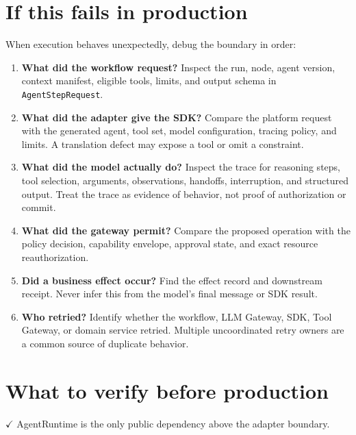 \section{If this fails in production}

When execution behaves unexpectedly, debug the boundary in order:\par

\begin{enumerate}

\item \textbf{What did the workflow request?} Inspect the run, node, agent version, context manifest, eligible tools, limits, and output schema in \lstinline[style=bookinline]!AgentStepRequest!.

\item \textbf{What did the adapter give the SDK?} Compare the platform request with the generated agent, tool set, model configuration, tracing policy, and limits. A translation defect may expose a tool or omit a constraint.

\item \textbf{What did the model actually do?} Inspect the trace for reasoning steps, tool selection, arguments, observations, handoffs, interruption, and structured output. Treat the trace as evidence of behavior, not proof of authorization or commit.

\item \textbf{What did the gateway permit?} Compare the proposed operation with the policy decision, capability envelope, approval state, and exact resource reauthorization.

\item \textbf{Did a business effect occur?} Find the effect record and downstream receipt. Never infer this from the model’s final message or SDK result.

\item \textbf{Who retried?} Identify whether the workflow, LLM Gateway, SDK, Tool Gateway, or domain service retried. Multiple uncoordinated retry owners are a common source of duplicate behavior.

\end{enumerate}

\section{What to verify before production}

\textbf{\ensuremath{\checkmark}} AgentRuntime is the only public dependency above the adapter boundary.\par

